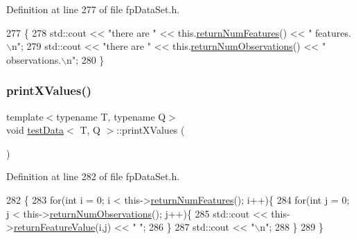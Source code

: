 Definition at line 277 of file fp\+Data\+Set.\+h.


\begin{DoxyCode}
277                              \{
278             std::cout << \textcolor{stringliteral}{"there are "} << this.\hyperlink{classtestData_a5ccc979935f93a18f7a35977a7715dbe}{returnNumFeatures}() << \textcolor{stringliteral}{" features.\(\backslash\)n"};
279             std::cout << \textcolor{stringliteral}{"there are "} << this.\hyperlink{classtestData_a7b7ea4d5b03144b691e909730d70ce62}{returnNumObservations}() << \textcolor{stringliteral}{"
       observations.\(\backslash\)n"};
280         \}
\end{DoxyCode}
\mbox{\label{classtestData_a56a646213b9d3edfeb8d97461c387437}} 
\subsubsection{\texorpdfstring{print\+X\+Values()}{printXValues()}}
{\footnotesize\ttfamily template$<$typename T, typename Q$>$ \\
void \hyperlink{classtestData}{test\+Data}$<$ T, Q $>$\+::print\+X\+Values (\begin{DoxyParamCaption}{ }\end{DoxyParamCaption})\hspace{0.3cm}{\ttfamily [inline]}}



Definition at line 282 of file fp\+Data\+Set.\+h.


\begin{DoxyCode}
282                            \{
283             \textcolor{keywordflow}{for}(\textcolor{keywordtype}{int} i = 0; i < this->\hyperlink{classtestData_a5ccc979935f93a18f7a35977a7715dbe}{returnNumFeatures}(); i++)\{
284                 \textcolor{keywordflow}{for}(\textcolor{keywordtype}{int} j = 0; j < this->\hyperlink{classtestData_a7b7ea4d5b03144b691e909730d70ce62}{returnNumObservations}(); j++)\{
285                     std::cout << this->\hyperlink{classtestData_aec2686210c4776df10cc0658133ed4ad}{returnFeatureValue}(i,j) << \textcolor{stringliteral}{" "};
286                 \}
287                 std::cout << \textcolor{stringliteral}{"\(\backslash\)n"};
288             \}
289         \}
\end{DoxyCode}
\mbox{\label{classtestData_a7141bf93c921a9f7ca4d47f890458123}} 
